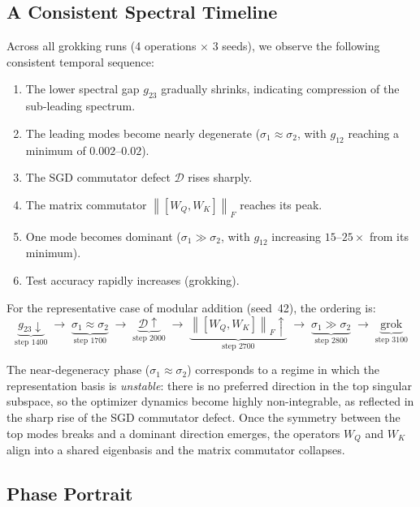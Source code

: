 \documentclass[11pt]{article}
\newcommand{\norm}[1]{\left\|#1\right\|}
\newcommand{\defect}{\mathcal{D}}
\begin{document}
\subsection{A Consistent Spectral Timeline}
\label{sec:spectral_timeline}

Across all grokking runs (4 operations $\times$ 3 seeds), we observe the following consistent temporal sequence:
\begin{enumerate}
    \item The lower spectral gap $g_{23}$ gradually shrinks, indicating compression of the sub-leading spectrum.
    \item The leading modes become nearly degenerate ($\sigma_1 \approx \sigma_2$, with $g_{12}$ reaching a minimum of $0.002$--$0.02$).
    \item The SGD commutator defect $\defect$ rises sharply.
    \item The matrix commutator $\norm{[W_Q, W_K]}_F$ reaches its peak.
    \item One mode becomes dominant ($\sigma_1 \gg \sigma_2$, with $g_{12}$ increasing $15$--$25\times$ from its minimum).
    \item Test accuracy rapidly increases (grokking).
\end{enumerate}

\noindent
For the representative case of modular addition (seed~42), the ordering is:
\begin{equation}
    \underbrace{g_{23}\!\downarrow}_{\text{step 1400}}
    \;\to\;
    \underbrace{\sigma_1 \approx \sigma_2}_{\text{step 1700}}
    \;\to\;
    \underbrace{\defect\!\uparrow}_{\text{step 2000}}
    \;\to\;
    \underbrace{\norm{[W_Q,W_K]}_F\!\uparrow}_{\text{step 2700}}
    \;\to\;
    \underbrace{\sigma_1 \gg \sigma_2}_{\text{step 2800}}
    \;\to\;
    \underbrace{\text{grok}}_{\text{step 3100}}
\end{equation}

\noindent
The near-degeneracy phase ($\sigma_1 \approx \sigma_2$) corresponds to a regime in which the representation basis is \emph{unstable}: there is no preferred direction in the top singular subspace, so the optimizer dynamics become highly non-integrable, as reflected in the sharp rise of the SGD commutator defect.
Once the symmetry between the top modes breaks and a dominant direction emerges, the operators $W_Q$ and $W_K$ align into a shared eigenbasis and the matrix commutator collapses.

\subsection{Phase Portrait}
\label{sec:phase_portrait}
\end{document}
